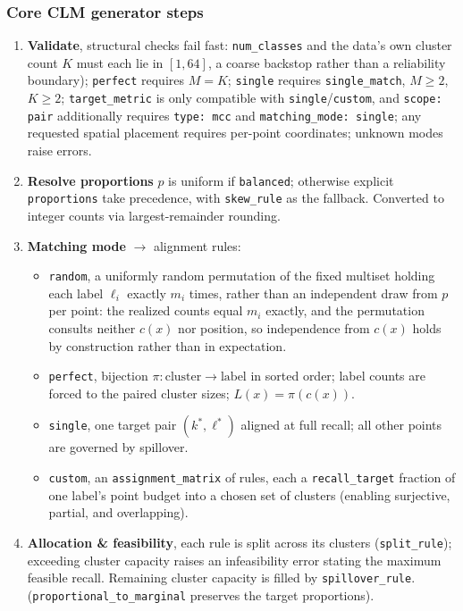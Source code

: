 \documentclass[a4paper,12pt]{article}
\begin{document}
\subsubsection{Core CLM generator steps}
\begin{enumerate}
    \item \textbf{Validate}, structural checks fail fast: \texttt{num\_classes} and the data's own cluster count $K$ must each lie in $[1,64]$, a coarse backstop rather than a reliability boundary); \texttt{perfect} requires $M = K$; \texttt{single} requires \texttt{single\_match}, $M \ge 2$, $K \ge 2$; \texttt{target\_metric} is only compatible with \texttt{single}/\texttt{custom}, and \texttt{scope: pair} additionally requires \texttt{type: mcc} and \texttt{matching\_mode: single}; any requested spatial placement requires per-point coordinates; unknown modes raise errors.
    \item \textbf{Resolve proportions} $p$ is uniform if \texttt{balanced}; otherwise explicit \texttt{proportions} take precedence, with \texttt{skew\_rule} as the fallback. Converted to integer counts via largest-remainder rounding.
    \item \textbf{Matching mode} $\to$ alignment rules:
    \begin{itemize}
        \item \texttt{random}, a uniformly random permutation of the fixed multiset holding each label $\ell_i$ exactly $m_i$ times, rather than an independent draw from $p$ per point: the realized counts equal $m_i$ exactly, and the permutation consults neither $c(x)$ nor position, so independence from $c(x)$ holds by construction rather than in expectation.
        \item \texttt{perfect}, bijection $\pi: \text{cluster} \to \text{label}$ in sorted order; label counts are forced to the paired cluster sizes; $L(x) = \pi(c(x))$.
        \item \texttt{single}, one target pair $(k^*, \ell^*)$ aligned at full recall; all other points are governed by spillover.
        \item \texttt{custom}, an \texttt{assignment\_matrix} of rules, each a \texttt{recall\_target} fraction of one label's point budget into a chosen set of clusters (enabling surjective, partial, and overlapping).
    \end{itemize}
    \item \textbf{Allocation \& feasibility}, each rule is split across its clusters (\texttt{split\_rule}); exceeding cluster capacity raises an infeasibility error stating the maximum feasible recall. Remaining cluster capacity is filled by \texttt{spillover\_rule}. (\texttt{proportional\_to\_marginal} preserves the target proportions).

\end{enumerate}
\end{document}
